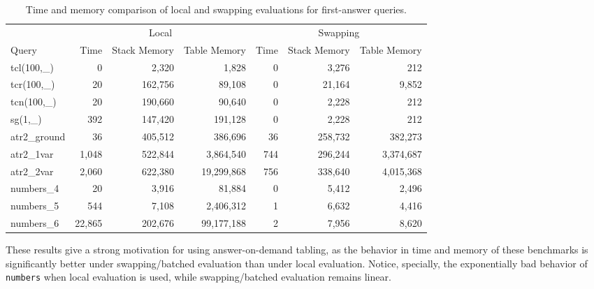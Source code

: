 \documentclass{./tlp}
\newcommand{\redfig}{\vspace{-1em}}
\begin{document}
\begin{table}[t] 
  \centering 
  \begin{tabular}{|l|r|r|r|r|r|r|}  
    \cline{1-7}
     & \multicolumn{3}{c|}{Local} & \multicolumn{3}{c|}{Swapping}  
    \\\cline{1-7} 
    Query & 
    Time & \parbox{5em}{\smallskip Stack  Memory}
    & \parbox{5em}{\smallskip Table Memory}
    & Time & \parbox{5em}{\smallskip Stack Memory}
    & \parbox{5em}{\smallskip Table Memory} 
    \\ 
    tcl(100,\_)  & 0 & 2,320   & 1,828     & 0 & 3,276   & 212    
    \\
    tcr(100,\_)  & 20 & 162,756 & 89,108    & 0 & 21,164  & 9,852    
    \\
    tcn(100,\_)  & 20 & 190,660 & 90,640    & 0 & 2,228   & 212    
    \\
    sg(1,\_)    & 392 & 147,420 & 191,128   & 0 & 2,228   & 212    
    \\ 
    atr2\_ground & 36 & 405,512 & 386,696   & 36 & 258,732 & 382,273
    \\
    atr2\_1var   & 1,048 & 522,844 & 3,864,540  & 744 & 296,244 & 3,374,687
    \\
    atr2\_2var   & 2,060 & 622,380 & 19,299,868 & 756 & 338,640 & 4,015,368
    \\
    numbers\_4   & 20 & 3,916   & 81,884    & 0 & 5,412 & 2,496    
    \\
    numbers\_5   & 544 & 7,108   & 2,406,312  & 1 & 6,632 & 4,416    
    \\
    numbers\_6   & 22,865 & 202,676 & 99,177,188 & 2 & 7,956 & 8,620    
    \\
  \end{tabular} 
  \caption{Time and memory comparison of local and swapping
    evaluations for first-answer queries.} 
\label{tab:first-answer-comparison} 
\redfig
\end{table} 

These results give a strong motivation for using answer-on-demand
tabling, as the behavior in time and memory of these benchmarks is
significantly better under swapping/batched evaluation than under
local evaluation.
Notice, specially, the exponentially bad behavior of
\lstinline{numbers} when local evaluation is used, while
swapping/batched evaluation remains linear.
\end{document}
